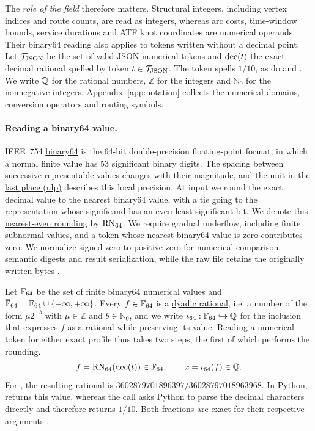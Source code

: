 The \emph{role of the field} therefore matters. Structural integers, including vertex indices and route counts, are read as integers, whereas arc costs, time-window bounds, service durations and ATF knot coordinates are numerical operands. Their binary64 reading also applies to tokens written without a decimal point. Let $\mathcal{T}_{\mathrm{JSON}}$ be the set of valid JSON numerical tokens and $\operatorname{dec}(t)$ the exact decimal rational spelled by token $t\in\mathcal{T}_{\mathrm{JSON}}$. The token  spells $1/10$, as do  and . We write $\mathbb{Q}$ for the rational numbers, $\mathbb{Z}$ for the integers and $\mathbb{N}_0$ for the nonnegative integers. Appendix~\ref{app:notation} collects the numerical domains, conversion operators and routing symbols.

\paragraph{Reading a binary64 value.}
IEEE~754 \href{https://en.wikipedia.org/wiki/Double-precision_floating-point_format}{binary64} is the 64-bit double-precision floating-point format, in which a normal finite value has 53 significant binary digits. The spacing between successive representable values changes with their magnitude, and the \href{https://en.wikipedia.org/wiki/Unit_in_the_last_place}{unit in the last place (ulp)} describes this local precision. At input we round the exact decimal value to the nearest binary64 value, with a tie going to the representation whose significand has an even least significant bit. We denote this \href{https://en.wikipedia.org/wiki/Rounding#Rounding_half_to_even}{nearest-even rounding} by $\operatorname{RN}_{64}$. We require gradual underflow, including finite subnormal values, and a token whose nearest binary64 value is zero contributes zero. We normalize signed zero to positive zero for numerical comparison, semantic digests and result serialization, while the raw file retains the originally written bytes \autocite{oracleIEEEArithmetic}.

Let $\mathbb{F}_{64}$ be the set of finite binary64 numerical values and $\overline{\mathbb{F}}_{64}=\mathbb{F}_{64}\cup\{-\infty,+\infty\}$. Every $f\in\mathbb{F}_{64}$ is a \href{https://en.wikipedia.org/wiki/Dyadic_rational}{dyadic rational}, i.e. a number of the form $\mu2^{-b}$ with $\mu\in\mathbb{Z}$ and $b\in\mathbb{N}_0$, and we write $\iota_{64}:\mathbb{F}_{64}\hookrightarrow\mathbb{Q}$ for the inclusion that expresses $f$ as a rational while preserving its value. Reading a numerical token for either exact profile thus takes two steps, the first of which performs the rounding.
\begin{equation}\label{eq:binary64-reading}
f=\operatorname{RN}_{64}(\operatorname{dec}(t))\in\mathbb{F}_{64},\qquad x=\iota_{64}(f)\in\mathbb{Q}.
\end{equation}
For , the resulting rational is $3602879701896397/36028797018963968$. In Python,  returns this value, whereas the call  asks Python to parse the decimal characters directly and therefore returns $1/10$. Both fractions are exact for their respective arguments \autocite{pythonFloatingPoint2026,pythonFractions2026}.

